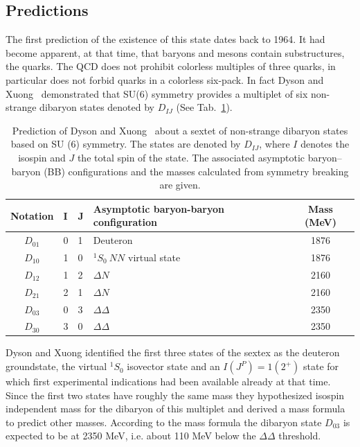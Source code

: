 %
\subsection{Predictions} \label{sec:2.2.1}

The first prediction of the existence of this state dates back to 1964. 
It had become apparent, at that time, that baryons and mesons contain substructures, the quarks.
The QCD does not prohibit colorless multiples of three quarks, in particular does not forbid 
quarks in a colorless six-pack. In fact Dyson and Xuong~\cite{dysonxuong} demonstrated that SU(6)
symmetry provides a multiplet of six non-strange dibaryon states denoted by $D_{IJ}$ 
(See Tab.~\ref{tab:dibaryons}).

\begingroup
\renewcommand{\arraystretch}{1.2} %
\begin{table} [htb]
\centering
\begin{tabularx}{\textwidth}{cXXlc}
\toprule
\textbf{Notation}    &   \textbf{I}   &   \textbf{J}   &   \textbf{Asymptotic baryon-baryon configuration}            &\textbf{Mass (MeV)} \\
\midrule
$D_{01}$    &   0   &   1   &   \qquad \qquad Deuteron                            &   1876    \\
$D_{10}$    &   1   &   0   &   \qquad \qquad $^{1}S_{0}\ NN$ virtual state       &   1876    \\ 
$D_{12}$    &   1   &   2   &   \qquad \qquad $\Delta N$                          &   2160    \\
$D_{21}$    &   2   &   1   &   \qquad \qquad $\Delta N$                          &   2160    \\
$D_{03}$    &   0   &   3   &   \qquad \qquad $\Delta \Delta$                     &   2350    \\
$D_{30}$    &   3   &   0   &   \qquad \qquad $\Delta \Delta$                     &   2350    \\
\bottomrule
\end{tabularx}
\caption{Prediction of Dyson and Xuong~\cite{dysonxuong} about a sextet of non-strange dibaryon states based on SU (6) symmetry. The states are denoted by $D_{IJ}$, where $I$ denotes the isospin and $J$ the total spin of the state. The associated asymptotic baryon–baryon (BB) configurations and the masses calculated from symmetry breaking are given.}
\label{tab:dibaryons}
\end{table}
\endgroup

Dyson and Xuong identified the first three states of the sextex as the deuteron groundstate, the virtual
$^{1}S_{0}$ isovector state and an $I(J^{P}) = 1(2^{+})$ state for which first experimental indications
had been available already at that time.
Since the first two states have roughly the same mass they hypothesized isospin independent mass for the 
dibaryon of this multiplet and derived a mass formula to predict other masses.
According to the mass formula the dibaryon state $D_{03}$ is expected to be at 2350 MeV, 
i.e. about 110 MeV below the $\Delta \Delta$ threshold.

